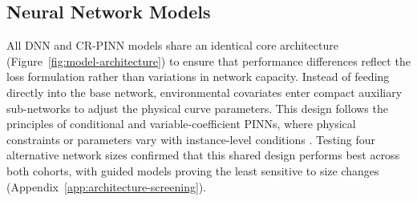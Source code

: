 \subsection{Neural Network Models}
\label{sec:rq1-pinn-loss}
All DNN and CR-PINN models share an identical core architecture (Figure~\ref{fig:model-architecture}) to ensure that performance differences reflect the loss formulation rather than variations in network capacity. Instead of feeding directly into the base network, environmental covariates enter compact auxiliary sub-networks to adjust the physical curve parameters. This design follows the principles of conditional and variable-coefficient PINNs, where physical constraints or parameters vary with instance-level conditions \citep{kovacs2022Conditional_C4_NN,miao2023VCPINN_C4_NN}. Testing four alternative network sizes confirmed that this shared design performs best across both cohorts, with guided models proving the least sensitive to size changes (Appendix~\ref{app:architecture-screening}).

